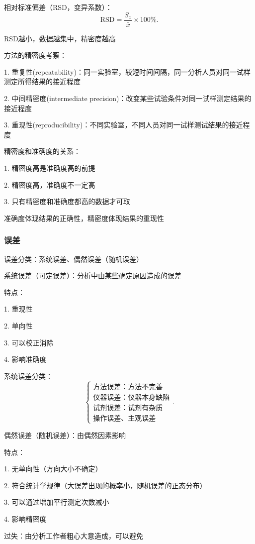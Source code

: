 相对标准偏差（RSD，变异系数）：\[
    \text{RSD}=\frac{S_x}{\bar{x}}\times 100\%
.\] 

RSD越小，数据越集中，精密度越高

\begin{notation}
    方法的精密度考察：

    1. 重复性(repeatability)：同一实验室，较短时间间隔，同一分析人员对同一试样测定所得结果的接近程度

    2. 中间精密度(intermediate precision)：改变某些试验条件对同一试样测定结果的接近程度

    3. 重现性(reproducibility)：不同实验室，不同人员对同一试样测试结果的接近程度
\end{notation}

\begin{notation}
    精密度和准确度的关系：

    1. 精密度高是准确度高的前提

    2. 精密度高，准确度不一定高

    3. 只有精密度和准确度都高的数据才可取
\end{notation}
\begin{notation}
    准确度体现结果的正确性，精密度体现结果的重现性
\end{notation}

\subsubsection{误差}%
\label{subsub:误差}
\begin{notation}
    误差分类：系统误差、偶然误差（随机误差）
\end{notation}
\begin{defi}
    系统误差（可定误差）：分析中由某些确定原因造成的误差

    特点：

    1. 重现性

    2. 单向性

    3. 可以校正消除

    4. 影响准确度
\end{defi}
\begin{notation}
    系统误差分类：
    \[
        \begin{cases}
            \text{方法误差：方法不完善}\\ 
            \text{仪器误差：仪器本身缺陷}\\ 
            \text{试剂误差：试剂有杂质}\\ 
            \text{操作误差、主观误差}
        \end{cases}
    .\] 
\end{notation}
\begin{defi}
    偶然误差（随机误差）：由偶然因素影响

    特点：

    1. 无单向性（方向大小不确定）

    2. 符合统计学规律（大误差出现的概率小，随机误差的正态分布）

    3. 可以通过增加平行测定次数减小

    4. 影响精密度
\end{defi}
\begin{defi}
    过失：由分析工作者粗心大意造成，可以避免
\end{defi}
